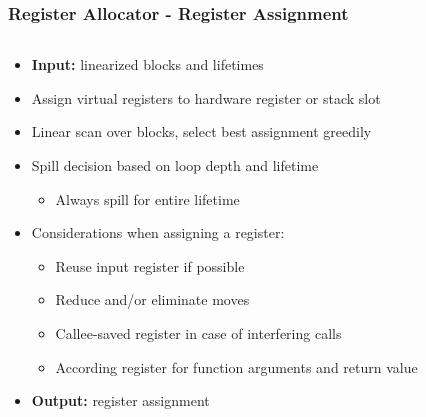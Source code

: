 \documentclass[navbaroff,en]{sdqbeamer}
\begin{document}
\begin{frame}
\frametitle{Register Allocator - Register Assignment}

\begin{columns}
	\begin{column}{0.65\textwidth}
		\begin{itemize}
			\item \textbf{Input:} linearized blocks and lifetimes
			\item Assign virtual registers to hardware register or stack slot
			\item Linear scan over blocks, select best assignment greedily
			\item Spill decision based on loop depth and lifetime 
			\begin{itemize}
				\item Always spill for entire lifetime
			\end{itemize}
			\item Considerations when assigning a register:
			\begin{itemize}
				\item Reuse input register if possible
				\item Reduce and/or eliminate moves
				\item Callee-saved register in case of interfering calls
				\item According register for function arguments and return value
			\end{itemize}
			\item \textbf{Output:} register assignment
		\end{itemize}
	\end{column}
	

\end{columns}
\end{frame}
\end{document}
